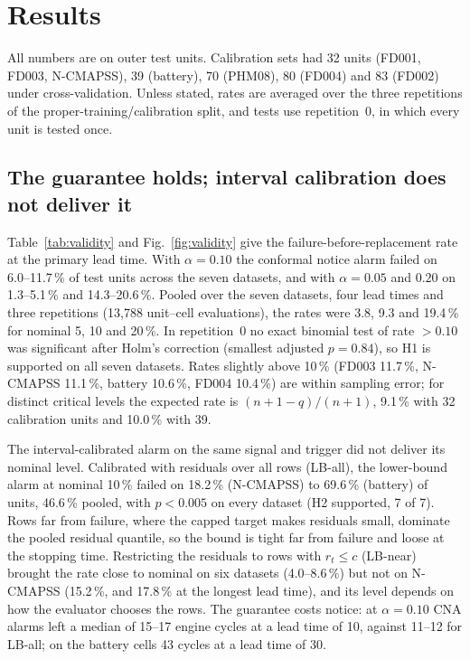 \section{Results}\label{sec:results}

All numbers are on outer test units. Calibration sets had 32 units (FD001, FD003, N-CMAPSS), 39 (battery), 70 (PHM08), 80 (FD004) and 83 (FD002) under cross-validation. Unless stated, rates are averaged over the three repetitions of the proper-training/calibration split, and tests use repetition~0, in which every unit is tested once.

\subsection{The guarantee holds; interval calibration does not deliver it}\label{sec:res-valid}

Table~\ref{tab:validity} and Fig.~\ref{fig:validity} give the failure-before-replacement rate at the primary lead time. With $\alpha=0.10$ the conformal notice alarm failed on 6.0--11.7\,\% of test units across the seven datasets, and with $\alpha=0.05$ and $0.20$ on 1.3--5.1\,\% and 14.3--20.6\,\%. Pooled over the seven datasets, four lead times and three repetitions (13,788 unit--cell evaluations), the rates were 3.8, 9.3 and 19.4\,\% for nominal 5, 10 and 20\,\%. In repetition~0 no exact binomial test of rate $>0.10$ was significant after Holm's correction (smallest adjusted $p=0.84$), so H1 is supported on all seven datasets. Rates slightly above 10\,\% (FD003 11.7\,\%, N-CMAPSS 11.1\,\%, battery 10.6\,\%, FD004 10.4\,\%) are within sampling error; for distinct critical levels the expected rate is $(n+1-q)/(n+1)$, 9.1\,\% with 32 calibration units and 10.0\,\% with 39.

The interval-calibrated alarm on the same signal and trigger did not deliver its nominal level. Calibrated with residuals over all rows (LB-all), the lower-bound alarm at nominal 10\,\% failed on 18.2\,\% (N-CMAPSS) to 69.6\,\% (battery) of units, 46.6\,\% pooled, with $p<0.005$ on every dataset (H2 supported, 7 of 7). Rows far from failure, where the capped target makes residuals small, dominate the pooled residual quantile, so the bound is tight far from failure and loose at the stopping time. Restricting the residuals to rows with $r_t\le c$ (LB-near) brought the rate close to nominal on six datasets (4.0--8.6\,\%) but not on N-CMAPSS (15.2\,\%, and 17.8\,\% at the longest lead time), and its level depends on how the evaluator chooses the rows. The guarantee costs notice: at $\alpha=0.10$ CNA alarms left a median of 15--17 engine cycles at a lead time of 10, against 11--12 for LB-all; on the battery cells 43 cycles at a lead time of 30.

